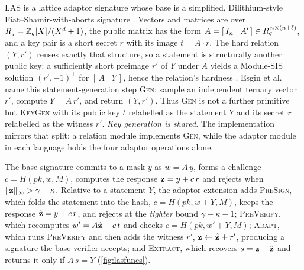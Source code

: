 LAS is a lattice adaptor signature whose base is a simplified, Dilithium-style
Fiat--Shamir-with-aborts signature \cite{esgin2020post,ducas2018crystals}. Vectors and
matrices are over $R_q = \mathbb{Z}_q[X]/(X^d+1)$, the public matrix has the form
$A = [\,I_n \mid A'\,] \in R_q^{\,n\times(n+\ell)}$, and a key pair is a short secret $r$
with its image $t = A\cdot r$. The hard relation $(Y,r')$ reuses exactly that structure,
so a statement is structurally another public key: a sufficiently short preimage $r'$ of $Y$
under $A$ yields a Module-SIS solution $(r',-1)^{\top}$ for $[\,A \mid Y\,]$, hence the
relation's hardness \cite{esgin2020post}. Esgin et al.\ \cite{esgin2020post}
name this statement-generation step \textsc{Gen}: sample an independent ternary vector
$r'$, compute $Y=A\,r'$, and
return $(Y,r')$. Thus \textsc{Gen} is not a further primitive but \textsc{KeyGen}
with its public key $t$ relabelled as the statement $Y$ and its secret $r$
relabelled as the witness $r'$. \emph{Key generation is shared.} The implementation
mirrors that split: a relation module implements \textsc{Gen}, while the adaptor module in each language holds the four adaptor operations alone.

The base signature commits to a mask $y$ as $w = A\,y$, forms a challenge
$c = H(\mathit{pk}, w, M)$, computes the response $\mathbf{z} = y + c\,r$ and rejects when
$\lVert \mathbf{z} \rVert_\infty > \gamma-\kappa$. Relative to a statement $Y$, the adaptor extension
\cite{esgin2020post} adds \textsc{PreSign}, which folds the statement into the hash,
$c = H(\mathit{pk}, w + Y, M)$, keeps the response $\hat{\mathbf{z}} = y + c\,r$, and rejects at
the \emph{tighter} bound
$\gamma-\kappa-1$; \textsc{PreVerify}, which recomputes $w' = A\hat{\mathbf{z}} - c\,t$ and checks
$c = H(\mathit{pk}, w'+Y, M)$; %
\textsc{Adapt}, which runs \textsc{PreVerify} and then adds the witness $r'$,
$\mathbf{z} \leftarrow \hat{\mathbf{z}} + r'$, producing a signature the base verifier accepts; and
\textsc{Extract}, which recovers $s = \mathbf{z} - \hat{\mathbf{z}}$ and returns it only if
$A\,s = Y$ (\cref{fig:lasfuncs}).


